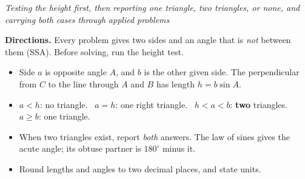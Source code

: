 \documentclass[12pt]{article}
\begin{document}


\begin{center}\small\textit{Testing the height first, then reporting one triangle, two triangles, or none, and carrying both cases through applied problems}\end{center}

\vspace{0.1cm}
\noindent\textbf{Directions.} Every problem gives two sides and an angle that is \emph{not} between them (SSA). Before solving, run the height test.
\begin{itemize}[leftmargin=0.9cm, itemsep=1pt, topsep=3pt]
  \item Side $a$ is opposite angle $A$, and $b$ is the other given side. The perpendicular from $C$ to the line through $A$ and $B$ has length $h = b\sin A$.
  \item $a < h$: no triangle. \ $a = h$: one right triangle. \ $h < a < b$: \textbf{two} triangles. \ $a \ge b$: one triangle.
  \item When two triangles exist, report \emph{both} answers. The law of sines gives the acute angle; its obtuse partner is $180^\circ$ minus it.
  \item Round lengths and angles to two decimal places, and state units.
\end{itemize}
\vspace{0.1cm}


\end{document}
